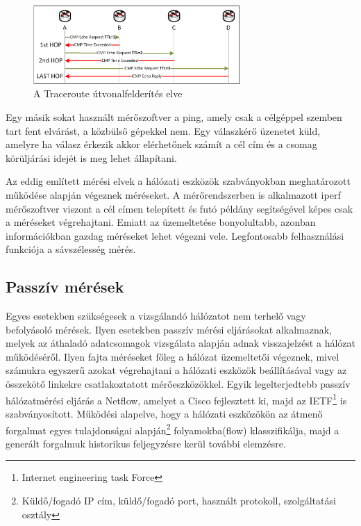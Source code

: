\begin{figure}[h]
	\centering
	\includegraphics[width=0.7\textwidth, keepaspectratio]{figures/traceroute-works.png}
	\caption{A Traceroute útvonalfelderítés elve\protect\footnotemark}
	\label{fig:traceroute-works}
\end{figure}


Egy másik sokat használt mérőszoftver a ping, amely csak a célgéppel szemben tart fent elvárást, a közbülső gépekkel nem. Egy válaszkérő üzenetet küld, amelyre ha válasz érkezik akkor elérhetőnek számít a cél cím és a csomag körüljárási idejét is meg lehet állapítani.

Az eddig említett mérési elvek a hálózati eszközök szabványokban meghatározott működése alapján végeznek méréseket. A mérőrendszerben is alkalmazott iperf mérőszoftver viszont a cél címen telepített és futó példány segítségével képes csak a méréseket végrehajtani. Emiatt az üzemeltetése bonyolultabb, azonban információkban gazdag méréseket lehet végezni vele. Legfontosabb felhasználási funkciója a sávszélesség mérés.

\subsection{Passzív mérések}

Egyes esetekben szükségesek a vizsgálandó hálózatot nem terhelő vagy befolyásoló mérések. Ilyen esetekben passzív mérési eljárásokat alkalmaznak, melyek az áthaladó adatcsomagok vizsgálata alapján adnak visszajelzést a hálózat működéséről. Ilyen fajta méréseket főleg a hálózat üzemeltetői végeznek, mivel számukra egyszerű azokat végrehajtani a hálózati eszközök beállításával vagy az összekötő linkekre csatlakoztatott mérőeszközökkel. Egyik legelterjedtebb passzív hálózatmérési eljárás a Netflow, amelyet a Cisco fejlesztett ki, majd az IETF\footnote{Internet engineering task Force} is szabványosított. Működési alapelve, hogy a hálózati eszközökön az átmenő forgalmat egyes tulajdonságai alapján\footnote{Küldő/fogadó IP cím, küldő/fogadó port, használt protokoll, szolgáltatási osztály} folyamokba(flow) klasszifikálja, majd a generált forgalmuk historikus feljegyzésre kerül további elemzésre. 

